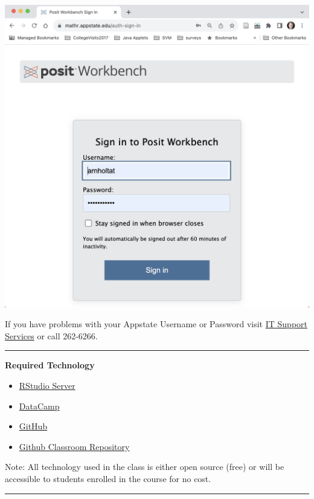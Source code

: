 \documentclass[
]{article}
\providecommand{\tightlist}{%
  \setlength{\itemsep}{0pt}\setlength{\parskip}{0pt}}
\begin{document}
\begin{center}\includegraphics[width=13.56in]{POSITlogin} \end{center}

If you have problems with your Appstate Username or Password visit
\href{http://support.appstate.edu/}{IT Support Services} or call
262-6266.

\begin{center}\rule{0.5\linewidth}{0.5pt}\end{center}

\textbf{Required Technology}

\begin{itemize}
\tightlist
\item
  \href{https://mathr.appstate.edu/}{RStudio Server}
\item
  \href{https://www.datacamp.com/}{DataCamp}
\item
  \href{https://github.com/}{GitHub}
\item
  \href{https://github.com/STT3850-FALL2024}{Github Classroom
  Repository}
\end{itemize}

Note: All technology used in the class is either open source (free) or
will be accessible to students enrolled in the course for no cost.

\begin{center}\rule{0.5\linewidth}{0.5pt}\end{center}
\end{document}
